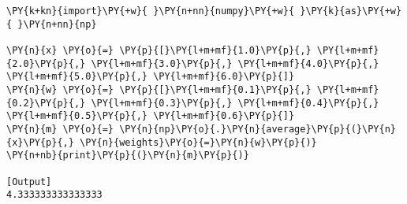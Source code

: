 \begin{Verbatim}[label=\makebox{\href{https://github.com/unipi-physics-labs/statnotes/tree/main/snippy/np.average.py}{https://github.com/.../np.average.py}},commandchars=\\\{\}]
\PY{k+kn}{import}\PY{+w}{ }\PY{n+nn}{numpy}\PY{+w}{ }\PY{k}{as}\PY{+w}{ }\PY{n+nn}{np}

\PY{n}{x} \PY{o}{=} \PY{p}{[}\PY{l+m+mf}{1.0}\PY{p}{,} \PY{l+m+mf}{2.0}\PY{p}{,} \PY{l+m+mf}{3.0}\PY{p}{,} \PY{l+m+mf}{4.0}\PY{p}{,} \PY{l+m+mf}{5.0}\PY{p}{,} \PY{l+m+mf}{6.0}\PY{p}{]}
\PY{n}{w} \PY{o}{=} \PY{p}{[}\PY{l+m+mf}{0.1}\PY{p}{,} \PY{l+m+mf}{0.2}\PY{p}{,} \PY{l+m+mf}{0.3}\PY{p}{,} \PY{l+m+mf}{0.4}\PY{p}{,} \PY{l+m+mf}{0.5}\PY{p}{,} \PY{l+m+mf}{0.6}\PY{p}{]}
\PY{n}{m} \PY{o}{=} \PY{n}{np}\PY{o}{.}\PY{n}{average}\PY{p}{(}\PY{n}{x}\PY{p}{,} \PY{n}{weights}\PY{o}{=}\PY{n}{w}\PY{p}{)}
\PY{n+nb}{print}\PY{p}{(}\PY{n}{m}\PY{p}{)}

[Output]
4.333333333333333
\end{Verbatim}
